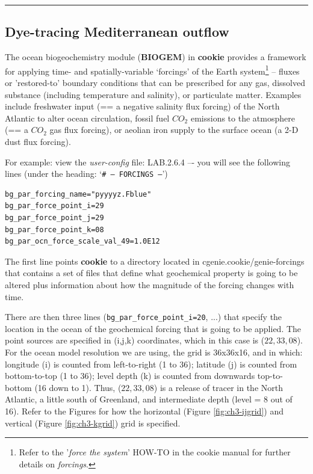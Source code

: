 \vspace{1mm}\noindent\rule{4cm}{0.5pt}\vspace{2mm}

\subsection{Dye-tracing Mediterranean outflow}

The ocean biogeochemistry module (\textbf{BIOGEM}) in \textbf{cookie} provides a framework for applying time- and spatially-variable ‘forcings’ of the Earth system\footnote{Refer to the '\textit{force the system}' \textsf{HOW-TO} in the cookie manual for further details on \textit{forcings}.} – fluxes or 'restored-to' boundary conditions that can be prescribed for any gas, dissolved substance (including temperature and salinity), or particulate matter. Examples include freshwater input (== a negative salinity flux forcing) of the North Atlantic to alter ocean circulation, fossil fuel \(CO_{2}\) emissions to the atmosphere (== a \(CO_{2}\) gas flux forcing), or aeolian iron supply to the surface ocean (a 2-D dust flux forcing).

\vspace{1mm}
For example: view the \textit{user-config} file: \textsf{\footnotesize LAB.2.6.4} –- you will see the following lines (under the heading: ‘\texttt{\# --- FORCINGS ---}’)

\vspace{-2mm}\small
\begin{verbatim}
bg_par_forcing_name="pyyyyz.Fblue"
bg_par_force_point_i=29
bg_par_force_point_j=29
bg_par_force_point_k=08
bg_par_ocn_force_scale_val_49=1.0E12
\end{verbatim}
\normalsize\vspace{-2mm}

The first line points \textbf{cookie} to a directory located in \textsf{\footnotesize cgenie.cookie/genie-forcings} that contains a set of files that define what geochemical property is going to be altered plus information about how the magnitude of the forcing changes with time.

There are then three lines (\texttt{\small bg\_par\_force\_point\_i=20}, ...) that specify the location in the ocean of the geochemical forcing that is going to be applied. The point sources are specified in (i,j,k) coordinates, which in this case is ($22,33,08$). For the ocean model resolution we are using, the grid is 36x36x16, and in which: longitude (i) is counted from left-to-right (1 to 36); latitude (j) is counted from bottom-to-top (1 to 36); level depth (k) is counted from downwards top-to-bottom (16 down to 1). Thus, ($22,33,08$) is a release of tracer in the North Atlantic, a little south of Greenland, and intermediate depth (level = 8 out of 16). Refer to the Figures for how the horizontal (Figure \ref{fig:ch3-ijgrid}) and vertical (Figure \ref{fig:ch3-kgrid}) grid is specified.


